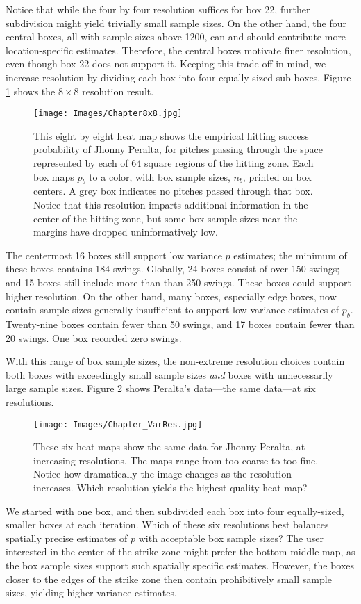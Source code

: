 Notice that while the four by four resolution suffices for box 22, further subdivision might yield trivially small sample sizes. On the other hand, the four central boxes, all with sample sizes above 1200, can and should contribute more location-specific estimates. Therefore, the central boxes motivate finer resolution, even though box 22 does not support it. Keeping this trade-off in mind, we increase resolution by dividing each box into four equally sized sub-boxes. Figure \ref{fig:8x8} shows the $8 \times 8$ resolution result.
        \begin{figure}[H]
      	\centering
      	\texttt{[image: Images/Chapter8x8.jpg]} 
      	\caption{This eight by eight heat map shows the empirical hitting success probability of Jhonny Peralta, for pitches passing through the space represented by each of 64 square regions of the hitting zone. Each box maps $p_{b}$ to a color, with box sample sizes, $n_{b}$, printed on box centers. A grey box indicates no pitches passed through that box. Notice that this resolution imparts additional information in the center of the hitting zone, but some box sample sizes near the margins have dropped uninformatively low.}
      	\label{fig:8x8}
      	\end{figure} 
The centermost 16 boxes still support low variance $p$ estimates; the minimum of these boxes contains 184 swings. Globally, 24 boxes consist of over 150 swings; and 15 boxes still include more than than 250 swings. These boxes could support higher resolution. On the other hand, many boxes, especially edge boxes, now contain sample sizes generally insufficient to support low variance estimates of $p_{b}$. Twenty-nine boxes contain fewer than 50 swings, and 17 boxes contain fewer than 20 swings. One box recorded zero swings.

With this range of box sample sizes, the non-extreme resolution choices contain both boxes with exceedingly small sample sizes {\it and} boxes with unnecessarily large sample sizes. Figure \ref{fig:6res} shows Peralta's data---the same data---at six resolutions. 
        \begin{figure}[H]
      	\centering
      	\texttt{[image: Images/Chapter\_VarRes.jpg]} 
      	\caption{These six heat maps show the same data for Jhonny Peralta, at increasing resolutions. The maps range from too coarse to too fine. Notice how dramatically the image changes as the resolution increases. Which resolution yields the highest quality heat map?}
      	\label{fig:6res}
      	\end{figure} 
We started with one box, and then subdivided each box into four equally-sized, smaller boxes at each iteration. Which of these six resolutions best balances spatially precise estimates of $p$ with acceptable box sample sizes? The user interested in the center of the strike zone might prefer the bottom-middle map, as the box sample sizes support such spatially specific estimates. However, the boxes closer to the edges of the strike zone then contain prohibitively small sample sizes, yielding higher variance estimates. 

